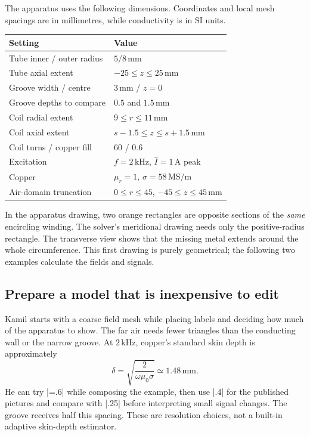 The apparatus uses the following dimensions. Coordinates and local mesh
spacings are in millimetres, while conductivity is in SI units.
\begin{center}
\begin{tabular}{ll}
\toprule Setting & Value\\
\midrule
Tube inner / outer radius & $5/8\,\mathrm{mm}$\\
Tube axial extent & $-25\leq z\leq25\,\mathrm{mm}$\\
Groove width / centre & $3\,\mathrm{mm}$ / $z=0$\\
Groove depths to compare & $0.5$ and $1.5\,\mathrm{mm}$\\
Coil radial extent & $9\leq r\leq11\,\mathrm{mm}$\\
Coil axial extent & $s-1.5\leq z\leq s+1.5\,\mathrm{mm}$\\
Coil turns / copper fill & $60$ / $0.6$\\
Excitation & $f=2\,\mathrm{kHz}$, $\widehat I=1\,\mathrm A$ peak\\
Copper & $\mu_r=1$, $\sigma=58\,\mathrm{MS/m}$\\
Air-domain truncation & $0\leq r\leq45$, $-45\leq z\leq45\,\mathrm{mm}$\\
\bottomrule
\end{tabular}
\end{center}
In the apparatus drawing, two orange rectangles are opposite sections of the
\emph{same} encircling winding. The solver's meridional drawing needs only the
positive-radius rectangle. The transverse view shows that the missing metal
extends around the whole circumference. This first drawing is purely
geometrical; the following two examples calculate the fields and signals.

\subsection{Prepare a model that is inexpensive to edit}
Kamil starts with a coarse field mesh while placing labels and deciding how
much of the apparatus to show. The far air needs fewer triangles than the
conducting wall or the narrow groove. At $2\,\mathrm{kHz}$, copper's standard
skin depth is approximately
\[
 \delta=\sqrt{\frac{2}{\omega\mu_0\sigma}}\simeq1.48\,\mathrm{mm}.
\]
He can try |\Mesh=.6| while composing the example, then use |.4| for the
published pictures and compare with |.25| before interpreting small signal
changes. The groove receives half this spacing. These are resolution choices,
not a built-in adaptive skin-depth estimator.

